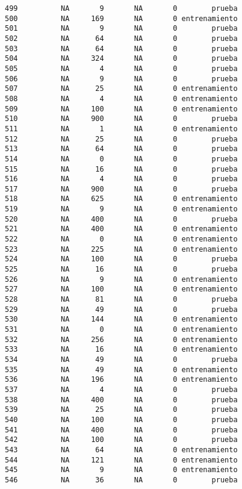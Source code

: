 \documentclass[
  letterpaper,
  DIV=11,
  numbers=noendperiod]{scrreprt}
\begin{document}
\begin{verbatim}
499          NA       9       NA       0        prueba
500          NA     169       NA       0 entrenamiento
501          NA       9       NA       0        prueba
502          NA      64       NA       0        prueba
503          NA      64       NA       0        prueba
504          NA     324       NA       0        prueba
505          NA       4       NA       0        prueba
506          NA       9       NA       0        prueba
507          NA      25       NA       0 entrenamiento
508          NA       4       NA       0 entrenamiento
509          NA     100       NA       0 entrenamiento
510          NA     900       NA       0        prueba
511          NA       1       NA       0 entrenamiento
512          NA      25       NA       0        prueba
513          NA      64       NA       0        prueba
514          NA       0       NA       0        prueba
515          NA      16       NA       0        prueba
516          NA       4       NA       0        prueba
517          NA     900       NA       0        prueba
518          NA     625       NA       0 entrenamiento
519          NA       9       NA       0 entrenamiento
520          NA     400       NA       0        prueba
521          NA     400       NA       0 entrenamiento
522          NA       0       NA       0 entrenamiento
523          NA     225       NA       0 entrenamiento
524          NA     100       NA       0        prueba
525          NA      16       NA       0        prueba
526          NA       9       NA       0 entrenamiento
527          NA     100       NA       0 entrenamiento
528          NA      81       NA       0        prueba
529          NA      49       NA       0        prueba
530          NA     144       NA       0 entrenamiento
531          NA       0       NA       0 entrenamiento
532          NA     256       NA       0 entrenamiento
533          NA      16       NA       0 entrenamiento
534          NA      49       NA       0        prueba
535          NA      49       NA       0 entrenamiento
536          NA     196       NA       0 entrenamiento
537          NA       4       NA       0        prueba
538          NA     400       NA       0        prueba
539          NA      25       NA       0        prueba
540          NA     100       NA       0        prueba
541          NA     400       NA       0        prueba
542          NA     100       NA       0        prueba
543          NA      64       NA       0 entrenamiento
544          NA     121       NA       0 entrenamiento
545          NA       9       NA       0 entrenamiento
546          NA      36       NA       0        prueba

\end{verbatim}
\end{document}
